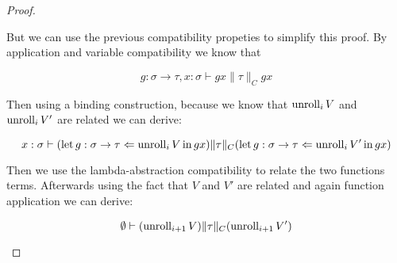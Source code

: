 \begin{proof}
\begin{itemize}
        But we can use the previous compatibility propeties 
        to simplify this proof. By application and variable 
        compatibility we know that 
        
        \begin{equation*}
            g : \sigma \to \tau, x : \sigma \vdash g x \| \tau \|_C g x
        \end{equation*}

        Then using a binding construction, because we know that
        $\Unroll_i V$ and $\Unroll_i V'$ are related we can derive:
        
        \begin{equation*}
            x : \sigma \vdash (\Bind{\Unroll_i V}{g : \sigma \to
                \tau}{g x}) \| \tau \|_C (\Bind{\Unroll_i V'}{g : \sigma
            \to \tau}{g x})
        \end{equation*}
        
        Then we use the lambda-abstraction compatibility to 
        relate the two functions terms.
        Afterwards using the fact that $V$ and $V'$ are related 
        and again function application we can derive:

        \begin{equation*}
            \emptyset \vdash (\Unroll_{i+1} V) \| \tau \|_C
            (\Unroll_{i+1} V')
        \end{equation*}

\end{itemize}
\end{proof}

